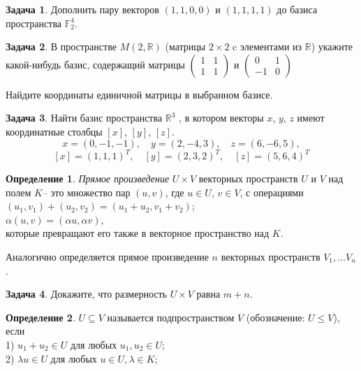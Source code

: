 \documentclass[12pt, fleqn]{extarticle}
\newcommand{\real}{\mathbb{R}}
\theoremstyle{definition}
\newtheorem{definition}{Определение}
\newtheorem{problem}{Задача}
\theoremstyle{remark}
\begin{document}
\begin{problem}
Дополнить пару векторов $(1, 1, 0, 0)$ и $(1, 1, 1, 1)$  
до базиса пространства $\mathbb{F}_2^{4}$.
\end{problem}


\begin{problem}
В пространстве $M(2, \real)$ (матрицы $2 \times 2$ c элементами из $\real$)
укажите какой-нибудь базис, содержащий матрицы 
$\left( \begin{array}{cc}
1 & 1\\
1 & 1 \end{array} \right)$ и
$\left( \begin{array}{cc}
0 & 1\\
-1 & 0 \end{array} \right)$

Найдите координаты единичной матрицы в выбранном базисе.
\end{problem}

\begin{problem}
Найти базис пространства $\real^{3}$ , в котором векторы $x$, $y$, $z$
имеют координатные столбцы $[x]$, $[y]$, $[z]$.
$$x = (0, -1, -1), \quad y = (2, -4, 3), \quad z = (6, -6, 5),$$
$$[x] = (1, 1, 1)^{T}, \quad [y] = (2, 3, 2)^{T}, \quad [z] = (5, 6, 4)^{T}$$
\end{problem}

\begin{definition}
{\it Прямое произведение} $U \times V$ векторных пространств $U$ и $V$ над полем $K$-- это множество пар
$(u, v)$, где $u \in U$, $v \in V$, с операциями\\
$(u_1, v_1) + (u_2, v_2) = (u_1 + u_2, v_1 + v_2)$;\\
$\alpha (u, v) = (\alpha u, \alpha v)$,\\
которые превращают его также в векторное пространство над $K$.

Аналогично определяется прямое произведение $n$ векторных пространств $V_1, \ldots V_n$.
\end{definition}

\begin{problem}
Докажите, что размерность $U \times V$ равна $m + n$. 
\end{problem}

\begin{definition}
$U \subseteq V$ называется подпространством $V$ (обозначение: $U \leqslant V$), если\\
1) $u_{1} + u_{2} \in U$ для любых $u_{1}, u_{2} \in U$;\\
2) $\lambda u \in U$ для любых $u \in U, \lambda \in K$;
\end{definition}
\end{document}
